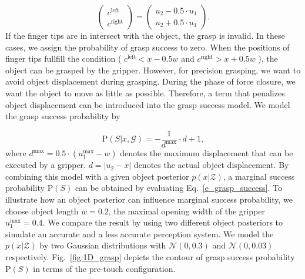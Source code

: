 \begin{equation}
\begin{pmatrix}
c^{\text{left}}\\ 
c^{\text{right}}
\end{pmatrix}
=\begin{pmatrix}
u_2 - 0.5 \cdot u_1\\ 
u_2 + 0.5 \cdot u_1
\end{pmatrix}.
\end{equation}
If the finger tips are in intersect with the object, the grasp is invalid. In these cases, we assign the probability of grasp success to zero. When the positions of finger tips fullfill the condition ( $c^{\text{left}} < x - 0.5w$ and $c^{\text{right}} > x + 0.5w$ ), the object can be grasped by the gripper. However, for precision grasping, we want to avoid object displacement during grasping. During the phase of force closure, we want the object to move as little as possible. Therefore, a term that penalizes object displacement can be introduced into the grasp success model. We model the grasp success probability by 

\begin{equation}
  \text{P}(S | x,  \mathcal{G} )  = -\frac{1}{ d^{\text{max}} } \cdot d + 1,
  \label{equ:5}
\end{equation}
where $d^{\text{max}}  = 0.5 \cdot (u_{1}^{\text{max}} - w) $ denotes the maximum displacement that can be executed by a gripper. $d = | u_2 - x | $ denotes the actual object displacement. By combining this model with a given object posterior $p(x|\mathcal{Z})$, a marginal success probability $\text{P}(S)$ can be obtained by evaluating Eq.~\ref{e_grasp_success}. To illustrate how an object posterior can influence marginal success probability, we choose object length $w = 0.2$, the maximal opening width of the gripper $u_{1}^{\text{max}} = 0.4 $. We compare the result by using two different object posteriors to simulate an accurate and a less accurate perception system. We model the $p(x|\mathcal{Z})$ by two Gaussian distributions with $\mathcal{N}(0, 0.3)$ and $\mathcal{N}(0, 0.03)$ respectively. Fig.~\ref{fig:1D_grasp} depicts the contour of grasp success probability $\text{P}(S)$ in terms of the pre-touch configuration.

